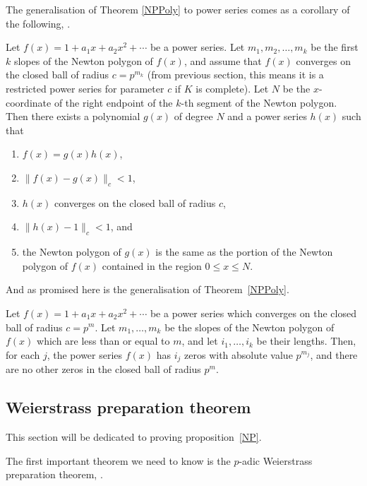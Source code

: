 The generalisation of Theorem \ref{NPPoly} to power series comes as a corollary of the following,
\cite[proposition~7.4.10]{Gouvea}.

\begin{proposition}\label{NP}
    Let $f(x) = 1 + a_1 x + a_2 x^2 + \cdots$ be a power series. Let $m_1,m_2, \dots,m_k$ be the
    first $k$ slopes of the Newton polygon of $f(x)$, and assume that $f(x)$ converges on the
    closed ball of radius $c = p^{m_k}$ (from previous section, this means it is a restricted power
    series for parameter $c$ if $K$ is complete). Let $N$ be the $x$-coordinate of the right
    endpoint of the $k$-th segment of the Newton polygon. Then there exists a polynomial
    $g(x)$ of degree $N$ and a power series $h(x)$ such that
    \begin{enumerate}
        \item $f(x) = g(x) h(x)$,
        \item $\| f(x) - g(x) \|_c < 1$,
        \item $h(x)$ converges on the closed ball of radius $c$,
        \item $\| h(x) - 1\|_c <1$, and
        \item the Newton polygon of $g(x)$ is the same as the portion of the Newton polygon of
        $f(x)$ contained in the region $0 \leq x \leq N$.
    \end{enumerate}
\end{proposition}

And as promised here is the generalisation of Theorem~\ref{NPPoly}.

\begin{corollary}
    Let $f(x) = 1 + a_1 x + a_2 x^2 + \cdots$ be a power series which converges on the closed ball
    of radius $c = p^m$. Let $m_1,\dots, m_k$ be the slopes of the Newton polygon of $f(x)$ which
    are less than or equal to $m$, and let $i_1,\dots,i_k$ be their lengths. Then, for each $j$, the
    power series $f(x)$ has $i_j$ zeros with absolute value $p^{m_j}$, and there are no other zeros
    in the closed ball of radius $p^m.$
\end{corollary}

\subsection{Weierstrass preparation theorem}

This section will be dedicated to proving proposition~\ref{NP}.

The first important theorem we need to know is the $p$-adic Weierstrass preparation theorem,
\cite[Theorem~7.2.10]{Gouvea}.

